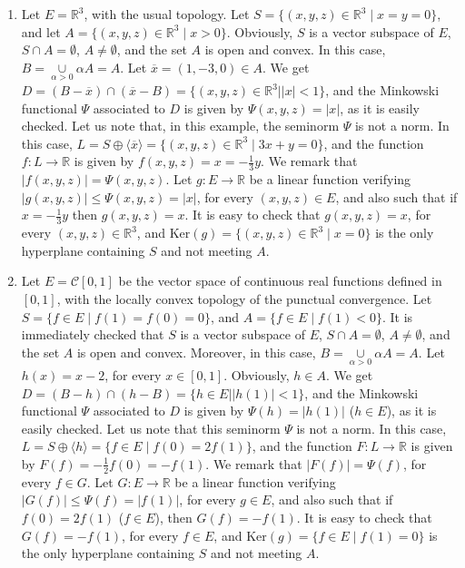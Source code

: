 \documentclass{article}
\begin{document}
\begin{enumerate}
\item Let $E=\mathbb{R}^{3}$, with the usual topology. Let $S=\{(x,y,z)\in\mathbb{R}^{3}\mid x=y=0\}$, and let $A=\{(x,y,z)\in\mathbb{R}^{3}\mid x>0\}$. Obviously, $S$ is a vector subspace of $E$, $S\cap A=\emptyset$, $A\neq\emptyset$, and the set $A$ is open and convex. In this case, $B=\underset{\alpha>0}{\cup}\alpha A=A$. Let $\overline{x}=(1,-3,0)\in A$. We get $D=(B-\overline{x})\cap(\overline{x}-B)=\{(x,y,z)\in\mathbb{R}^{3}\mid\vert x\vert<1\}$, and the Minkowski functional $\Psi$ associated to $D$ is given by $\Psi(x,y,z)=\vert x\vert$, as it is easily checked. Let us note that, in this example, the seminorm $\Psi$ is not a norm. In this case, $L=S\oplus\langle\overline{x}\rangle=\{(x,y,z)\in\mathbb{R}^3\mid 3x+y=0\}$, and the function $f:L\rightarrow\mathbb{R}$ is given by $f(x,y,z)=x=-\frac{1}{3}y$. We remark that $\vert f(x,y,z)\vert=\Psi(x,y,z)$. Let $g:E\rightarrow\mathbb{R}$ be a linear function verifying $\vert g(x,y,z)\vert\leq\Psi(x,y,z)=\vert x\vert $, for every $(x,y,z)\in E$, and also such that if $x=-\frac{1}{3}y$ then $g(x,y,z)=x$. It is easy to check that $g(x,y,z)=x$, for every $(x,y,z)\in\mathbb{R}^{3}$, and $\text{Ker}(g)=\{(x,y,z)\in\mathbb{R}^{3}\mid x=0\}$ is the only hyperplane containing $S$ and not meeting $A$.


\item Let $E=\mathcal C[0,1]$ be the vector space of continuous real functions defined in $[0,1]$, with the locally convex topology of the punctual convergence. Let $S=\{f\in E\mid f(1)=f(0)=0\}$, and $A=\{f\in E\mid f(1)<0\}$. It is immediately checked that $S$ is a vector subspace of $E$, $S\cap A=\emptyset$, $A\neq\emptyset$, and the set $A$ is open and convex. Moreover, in this case, $B=\underset{\alpha>0}{\cup}\alpha A=A$. Let $h(x)=x-2$, for every $x\in[0,1]$. Obviously, $h\in A$. We get $D=(B-h)\cap(h-B)=\{h\in E\mid\vert h(1)\vert<1\}$, and the Minkowski functional $\Psi$ associated to $D$ is given by $\Psi(h)=\vert h(1)\vert $ ($h\in E$), as it is easily checked. Let us note that this seminorm $\Psi$ is not a norm. In this case, $L=S\oplus\langle h\rangle=\{f\in E\mid f(0)=2f(1)\}$, and the function $F:L\rightarrow\mathbb{R}$ is given by $F(f)=-\frac{1}{2}f(0)=-f(1)$. We remark that $\vert F(f)\vert =\Psi(f)$, for every $f\in G$. Let $G:E\rightarrow\mathbb{R}$ be a linear function verifying $\vert G(f)\vert\leq\Psi(f)=\vert f(1)\vert $, for every $g\in E$, and also such that if $f(0)=2f(1)$ ($f\in E$), then $G(f)=-f(1)$. It is easy to check that $G(f)=-f(1)$, for every $f\in E$, and $\text{Ker}(g)=\{f\in E\mid f(1)=0\}$ is the only hyperplane containing $S$ and not meeting $A$.
\end{enumerate}
\end{document}

